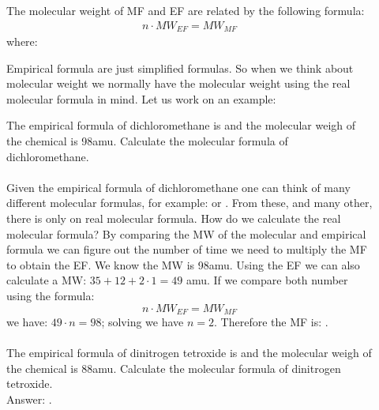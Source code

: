 \documentclass[main.tex]{subfiles}
\begin{document}
\begin{description}
\item[] The molecular weight of MF and EF are related by the following formula:
\begin{equation*}\begin{split}
\boxed{  n\cdot MW_{EF} = MW_{MF} } 
\end{split}\end{equation*}
where:
Empirical formula are just simplified formulas. So when we think about molecular weight we normally have the molecular weight using the real molecular formula in mind. Let us work on an example:
\begin{example} %
The empirical formula of dichloromethane is  and the molecular weigh of the chemical is 98amu. Calculate the molecular formula of dichloromethane.\\
\\
Given the empirical formula of dichloromethane one can think of many different molecular formulas, for example:  or . From these, and many other, there is only on real molecular formula. How do we calculate the real molecular formula? By comparing the MW of the molecular and empirical formula we can figure out the number of time we need to multiply the MF to obtain the EF. We know the MW is 98amu. Using the EF we can also calculate a MW: $35+12+2\cdot 1=49$ amu. If we compare both number using the formula:
\[n\cdot MW_{EF}= MW_{MF}\]
we have: $49\cdot n= 98$; solving we have $n=2$. Therefore the MF is: .
\\
\faDiamond\ \\
The empirical formula of dinitrogen tetroxide is  and the molecular weigh of the chemical is 88amu. Calculate the molecular formula of dinitrogen tetroxide.\\
\flushright Answer: .
\end{example}%
\end{description}
\end{document}
